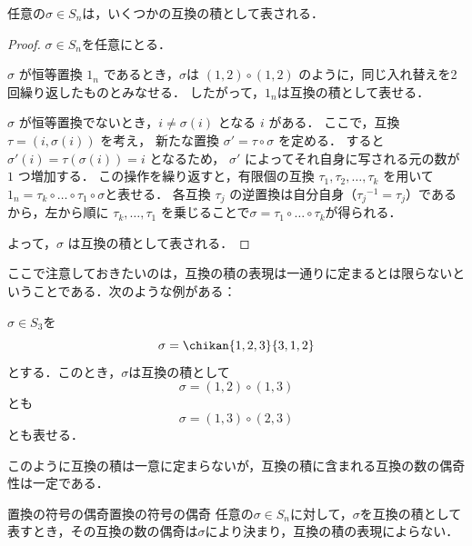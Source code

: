 \begin{prop}{}{}
  任意の$\sigma \in S_n$は，いくつかの互換の積として表される．
\end{prop}


\begin{leftbar}
  \begin{proof}
     $\sigma \in S_n$を任意にとる．

     $\sigma$ が恒等置換 $1_n$ であるとき，$\sigma$は $(1, 2) \circ (1, 2)$ のように，同じ入れ替えを2回繰り返したものとみなせる．
     したがって，$1_n$は互換の積として表せる．
     
    $\sigma$ が恒等置換でないとき，$i \ne \sigma(i)$ となる $i$ がある．
    ここで，互換 $\tau = (i, \sigma(i))$ を考え，
    新たな置換 $\sigma' = \tau \circ \sigma$ を定める．
    すると$\sigma'(i) = \tau(\sigma(i)) = i$ となるため，
   $\sigma'$ によってそれ自身に写される元の数が $1$ つ増加する．
この操作を繰り返すと，有限個の互換 $\tau_1, \tau_2, \dots, \tau_k$ を用いて
$1_n = \tau_k \circ \dots \circ \tau_1 \circ \sigma$と表せる．
各互換 $\tau_j$ の逆置換は自分自身（${\tau_j}^{-1} = \tau_j$）であるから，左から順に $\tau_k, \dots, \tau_1$ を乗じることで$ \sigma = \tau_1 \circ \dots \circ \tau_k $が得られる．

よって，$\sigma$ は互換の積として表される．
  \end{proof}
\end{leftbar}

ここで注意しておきたいのは，互換の積の表現は一通りに定まるとは限らないということである．次のような例がある：

\begin{example}{}{}
  $\sigma \in S_3$を
  \[
  \sigma = \chikan{1, 2, 3}{3, 1, 2}
  \]
  とする．このとき，$\sigma$は互換の積として
  \[
  \sigma = (1, 2) \circ (1, 3)
  \]
  とも
  \[
  \sigma = (1, 3) \circ (2, 3)
  \]
  とも表せる．
\end{example}

このように互換の積は一意に定まらないが，互換の積に含まれる互換の数の偶奇性は一定である．

\begin{prop}{置換の符号の偶奇}{置換の符号の偶奇}
  任意の$\sigma \in S_n$に対して，$\sigma$を互換の積として表すとき，その互換の数の偶奇は$\sigma$により決まり，互換の積の表現によらない．
\end{prop}

